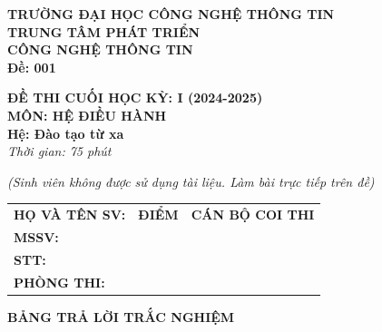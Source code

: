 \documentclass[11pt,a4paper]{article}
\begin{document}
\noindent
\begin{minipage}[t]{0.48\textwidth}
    \centering
    \textbf{TRƯỜNG ĐẠI HỌC CÔNG NGHỆ THÔNG TIN}\\
    \textbf{TRUNG TÂM PHÁT TRIỂN}\\
    \textbf{CÔNG NGHỆ THÔNG TIN}\\
    \vspace{0.2cm}
    \textbf{Đề: 001}
\end{minipage}
\hfill
\begin{minipage}[t]{0.48\textwidth}
    \centering
    \textbf{ĐỀ THI CUỐI HỌC KỲ: I (2024-2025)}\\
    \textbf{MÔN: HỆ ĐIỀU HÀNH}\\
    \textbf{Hệ: Đào tạo từ xa}\\
    \vspace{0.2cm}
    \textit{Thời gian: 75 phút}
\end{minipage}

\vspace{0.3cm}
\begin{center}
    \textit{(Sinh viên không được sử dụng tài liệu. Làm bài trực tiếp trên đề)}
\end{center}

\vspace{0.2cm}

\noindent
\begin{tabularx}{\textwidth}{|X|p{2.2cm}|p{4cm}|}
\hline
\textbf{HỌ VÀ TÊN SV:} \dotfill & \centering\textbf{ĐIỂM} & \centering\textbf{CÁN BỘ COI THI} \tabularnewline
\textbf{MSSV:} \dotfill & & \tabularnewline
\textbf{STT:} \dotfill & & \tabularnewline
\textbf{PHÒNG THI:} \dotfill & & \tabularnewline
\hline
\end{tabularx}

\vspace{0.4cm}

\begin{center}
    \textbf{\large BẢNG TRẢ LỜI TRẮC NGHIỆM}
\end{center}
\end{document}
